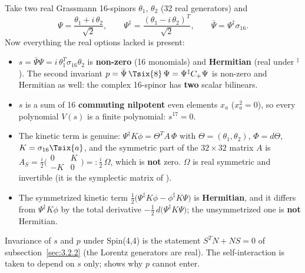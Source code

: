 Take two real Grassmann 16-spinors $\theta_1$, $\theta_2$ (32 real generators) and
\[
  \Psi=\frac{\theta_1+i\,\theta_2}{\sqrt2},\qquad
  \Psi^{\ddagger}=\frac{(\theta_1-i\,\theta_2)^{T}}{\sqrt2},\qquad
  \bar\Psi=\Psi^{\ddagger}\sigma_{16} .
\]
Now everything the real options lacked is present:
\begin{itemize}
  \item $s=\bar\Psi\Psi=i\,\theta_1^{T}\sigma_{16}\theta_2$ is \textbf{non-zero} (16 monomials) and
        \textbf{Hermitian} (real under ${}^{\ddagger}$). The second invariant
        $p=\bar\Psi\,\Tsix{8}\,\Psi=\Psi^{\ddagger}C_+\Psi$ is non-zero and Hermitian as well: the
        complex 16-spinor has \textbf{two} scalar bilinears.
  \item $s$ is a sum of 16 \textbf{commuting nilpotent} even elements $x_a$ ($x_a^2=0$), so every
        polynomial $V(s)$ is a finite polynomial: $s^{17}=0$.
  \item The kinetic term is genuine: $\Psi^{\ddagger}K\phi=\Theta^{T}A\,\Phi$ with
        $\Theta=(\theta_1,\theta_2)$, $\Phi=d\Theta$, $K=\sigma_{16}\Tsix{a}$, and the symmetric part
        of the $32\times32$ matrix $A$ is
        $A_S=\tfrac{i}{2}\bigl(\begin{smallmatrix}0&K\\-K&0\end{smallmatrix}\bigr)=:\tfrac{i}{2}\,\Omega$,
        which is \textbf{not} zero. $\Omega$ is real symmetric and invertible (it is the symplectic
        matrix of ).
  \item The symmetrized kinetic term $\tfrac12\bigl(\Psi^{\ddagger}K\phi-\phi^{\ddagger}K\Psi\bigr)$
        is \textbf{Hermitian}, and it differs from $\Psi^{\ddagger}K\phi$ by the total derivative
        $-\tfrac12\,d\bigl(\Psi^{\ddagger}K\Psi\bigr)$; the unsymmetrized one is \textbf{not}
        Hermitian.
\end{itemize}
Invariance of $s$ and $p$ under Spin(4,4) is the statement $S^{T}N+NS=0$ of
subsection~\ref{sec:3.2.2} (the Lorentz generators are real). The self-interaction is taken to depend
on $s$ only;  shows why $p$ cannot enter. 
